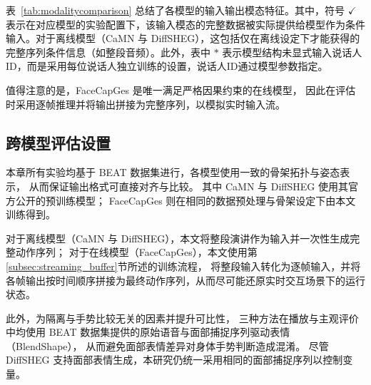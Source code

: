 表~\ref{tab:modalitycomparison} 总结了各模型的输入输出模态特征。其中，符号 $\checkmark$ 表示在对应模型的实验配置下，该输入模态的完整数据被实际提供给模型作为条件输入。对于离线模型（CaMN 与 DiffSHEG），这包括仅在离线设定下才能获得的完整序列条件信息（如整段音频）。此外，表中 $\ast$ 表示模型结构未显式输入说话人ID，而是采用每位说话人独立训练的设置，说话人ID通过模型参数指定。

值得注意的是，FaceCapGes 是唯一满足严格因果约束的在线模型，
因此在评估时采用逐帧推理并将输出拼接为完整序列，以模拟实时输入流。

\begin{table}[h]
\centering
{}
\label{tab:modalitycomparison}
\end{table}

\subsection{跨模型评估设置}
本章所有实验均基于 BEAT 数据集进行，各模型使用一致的骨架拓扑与姿态表示，
从而保证输出格式可直接对齐与比较。
其中 CaMN 与 DiffSHEG 使用其官方公开的预训练模型；
FaceCapGes 则在相同的数据预处理与骨架设定下由本文训练得到。

对于离线模型（CaMN 与 DiffSHEG），本文将整段演讲作为输入并一次性生成完整动作序列；
对于在线模型（FaceCapGes），本文使用第\ref{subsec:streaming_buffer}节所述的训练流程，
将整段输入转化为逐帧输入，并将各帧输出按时间顺序拼接为最终动作序列，从而尽可能还原实时交互场景下的运行状态。

此外，为隔离与手势比较无关的因素并提升可比性，
三种方法在播放与主观评价中均使用 BEAT 数据集提供的原始语音与面部捕捉序列驱动表情（BlendShape），
从而避免面部表情差异对身体手势判断造成混淆。
尽管 DiffSHEG 支持面部表情生成，本研究仍统一采用相同的面部捕捉序列以控制变量。

